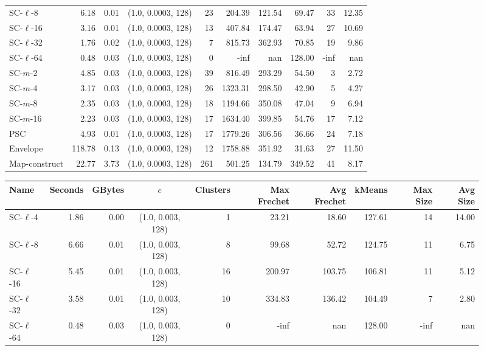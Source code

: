 \documentclass[11pt]{article}
\begin{document}
\begin{figure}
\begin{center}
\begin{minipage}{\textwidth}
{\begin{tabular}{@{}lrrcrrrrrr@{}}
        SC-$\ell$-8 & 6.18 & 0.01 & (1.0, 0.0003, 128) & 23 & 204.39 & 121.54 & 69.47 & 33 & 12.35\\
        SC-$\ell$-16 & 3.16 & 0.01 & (1.0, 0.0003, 128) & 13 & 407.84 & 174.47 & 63.94 & 27 & 10.69\\
        SC-$\ell$-32 & 1.76 & 0.02 & (1.0, 0.0003, 128) & 7 & 815.73 & 362.93 & 70.85 & 19 & 9.86\\
        SC-$\ell$-64 & 0.48 & 0.03 & (1.0, 0.0003, 128) & 0 & -inf & nan & 128.00 & -inf & nan\\
        SC-$m$-2 & 4.85 & 0.03 & (1.0, 0.0003, 128) & 39 & 816.49 & 293.29 & 54.50 & 3 & 2.72\\
        SC-$m$-4 & 3.17 & 0.03 & (1.0, 0.0003, 128) & 26 & 1323.31 & 298.50 & 42.90 & 5 & 4.27\\
        SC-$m$-8 & 2.35 & 0.03 & (1.0, 0.0003, 128) & 18 & 1194.66 & 350.08 & 47.04 & 9 & 6.94\\
        SC-$m$-16 & 2.23 & 0.03 & (1.0, 0.0003, 128) & 17 & 1634.40 & 399.85 & 54.76 & 17 & 7.12\\
        PSC & 4.93 & 0.01 & (1.0, 0.0003, 128) & 17 & 1779.26 & 306.56 & 36.66 & 24 & 7.18\\
        Envelope & 118.78 & 0.13 & (1.0, 0.0003, 128) & 12 & 1758.88 & 351.92 & 31.63 & 27 & 11.50\\
        Map-construct & 22.77 & 3.73 & (1.0, 0.0003, 128) & 261 & 501.25 & 134.79 & 349.52 & 41 & 8.17\\
        \bottomrule
    \end{tabular}}
    {
    \begin{tabular}{@{}lrrcrrrrrr@{}}
        \toprule
        Name & Seconds & GBytes & $c$ & Clusters & Max Frechet & Avg Frechet & kMeans & Max Size & Avg Size\\
        \midrule
        SC-$\ell$-4 & 1.86 & 0.00 & (1.0, 0.003, 128) & 1 & 23.21 & 18.60 & 127.61 & 14 & 14.00\\
        SC-$\ell$-8 & 6.66 & 0.01 & (1.0, 0.003, 128) & 8 & 99.68 & 52.72 & 124.75 & 11 & 6.75\\
        SC-$\ell$-16 & 5.45 & 0.01 & (1.0, 0.003, 128) & 16 & 200.97 & 103.75 & 106.81 & 11 & 5.12\\
        SC-$\ell$-32 & 3.58 & 0.01 & (1.0, 0.003, 128) & 10 & 334.83 & 136.42 & 104.49 & 7 & 2.80\\
        SC-$\ell$-64 & 0.48 & 0.03 & (1.0, 0.003, 128) & 0 & -inf & nan & 128.00 & -inf & nan\\

\end{tabular}}
\end{minipage}
\end{center}
\end{figure}
\end{document}
